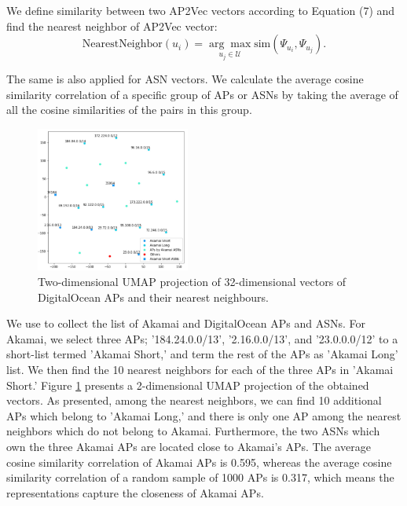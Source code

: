 \documentclass[10pt,journal]{IEEEtran}
\begin{document}
We define similarity between two AP2Vec vectors according to Equation (7) and find the nearest neighbor of AP2Vec vector:
\begin{equation}
\text{NearestNeighbor}(u_{i}) = \underset{u_{j}\in\mathcal{U}}{\arg\max} \text{sim}(\Psi_{u_{i}},\Psi_{u_{j}}).
\end{equation}

The same is also applied for ASN vectors. We calculate the average cosine similarity correlation of a specific group of APs or ASNs by taking the average of all the cosine similarities of the pairs in this group.

\begin{figure}[h]
\centering
\includegraphics[width=0.45\textwidth]{figures/fig4.png}
\caption{Two-dimensional UMAP projection of 32-dimensional vectors of DigitalOcean APs and their nearest neighbours.}
\label{fig:umap_digitalocean}
\end{figure}

We use to collect the list of Akamai and DigitalOcean APs and ASNs. For Akamai, we select three APs; '184.24.0.0/13', '2.16.0.0/13', and '23.0.0.0/12' to a short-list termed 'Akamai Short,' and term the rest of the APs as 'Akamai Long' list. We then find the 10 nearest neighbors for each of the three APs in 'Akamai Short.' Figure \ref{fig:umap_digitalocean} presents a 2-dimensional UMAP projection of the obtained vectors. As presented, among the nearest neighbors, we can find 10 additional APs which belong to 'Akamai Long,' and there is only one AP among the nearest neighbors which do not belong to Akamai. Furthermore, the two ASNs which own the three Akamai APs are located close to Akamai's APs. The average cosine similarity correlation of Akamai APs is 0.595, whereas the average cosine similarity correlation of a random sample of 1000 APs is 0.317, which means the representations capture the closeness of Akamai APs.
\end{document}
